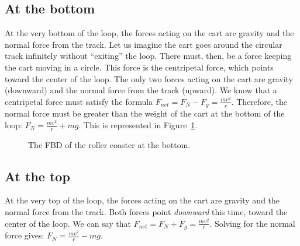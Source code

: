 \subsection{At the bottom}
At the very bottom of the loop, the forces acting on the cart are gravity and the normal force from the track. Let us imagine the cart goes around the circular track infinitely without ``exiting'' the loop. There must, then, be a force keeping the cart moving in a circle. This force is the centripetal force, which points toward the center of the loop. The only two forces acting on the cart are gravity (downward) and the normal force from the track (upward). We know that a centripetal force must satisfy the formula $F_{net} = F_N - F_g = \frac{mv^2}{r}$. Therefore, the normal force must be greater than the weight of the cart at the bottom of the loop: $F_N = \frac{mv^2}{r} + mg$. This is represented in Figure~\ref{fig:roller_bottom}.

\begin{figure}[H]
  \centering
  \caption{The FBD of the roller coaster at the bottom.}
  \label{fig:roller_bottom}
\end{figure}
\subsection{At the top}
At the very top of the loop, the forces acting on the cart are gravity and the normal force from the track. Both forces point \emph{downward} this time, toward the center of the loop. We can say that $F_{net} = F_N + F_g = \frac{mv^2}{r}$. Solving for the normal force gives: $F_N = \frac{mv^2}{r} - mg$.

